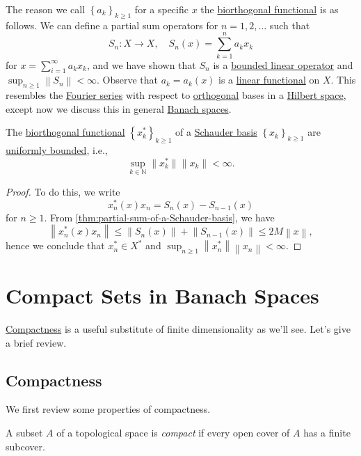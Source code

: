 The reason we call \(\left\{ a_k \right\} _{k\geq 1}\) for a specific \(x\) the \hyperref[def:biorthogonal-functional]{biorthogonal functional} is as follows. We can define a partial sum operators for \(n = 1, 2, \ldots  \) such that
\[
	S_n\colon X\to X,\quad S_n (x) = \sum\limits_{k=1}^{n} a_k x_k
\]
for \(x = \sum_{i=1}^{\infty }a_k x_k\), and we have shown that \(S_n\) is a \hyperref[def:bounded-linear-op]{bounded linear operator} and \(\sup _{n\geq 1} \left\lVert S_n\right\rVert < \infty \). Observe that \(a_k = a_k(x)\) is a \hyperref[def:linear-functional]{linear functional} on \(X\). This resembles the \hyperref[def:Fourier-series]{Fourier series} with respect to \hyperref[def:orthogonal-system]{orthogonal} bases in a \hyperref[def:Hilbert-space]{Hilbert space}, except now we discuss this in general \hyperref[def:Banach-space]{Banach spaces}.

\begin{proposition}
	The \hyperref[def:biorthogonal-functional]{biorthogonal functional} \(\left\{ x_k^{\ast} \right\} _{k\geq 1}\) of a \hyperref[def:Schauder-basis]{Schauder basis} \(\left\{ x_k \right\} _{k\geq 1}\) are \hyperref[def:uniformly-bounded]{uniformly bounded}, i.e.,
	\[
		\sup _{k\in \mathbb{N} }\lVert x_k ^{\ast}  \rVert \lVert x_{k}  \rVert < \infty .
	\]
\end{proposition}
\begin{proof}
	To do this, we write
	\[
		x_n^{\ast} (x) x_n = S_n(x) - S_{n-1}(x)
	\]
	for \(n \geq 1\). From \autoref{thm:partial-sum-of-a-Schauder-basis}, we have
	\[
		\left\lVert x^{\ast} _n(x)x_n\right\rVert \leq \left\lVert S_n(x)\right\rVert + \left\lVert S_{n-1}(x) \right\rVert \leq 2M \left\lVert x\right\rVert,
	\]
	hence we conclude that \(x_n^{\ast} \in X^{\ast} \) and \(\sup _{n\geq 1} \left\lVert x_n^{\ast} \right\rVert \left\lVert x_n\right\rVert < \infty \).
\end{proof}

\section{Compact Sets in Banach Spaces}
\hyperref[def:compact]{Compactness} is a useful substitute of finite dimensionality as we'll see. Let's give a brief review.
\subsection{Compactness}
We first review some properties of compactness.

\begin{definition}[Compact]\label{def:compact}
	A subset \(A\) of a topological space is \emph{compact} if every open cover of \(A\) has a finite subcover.
\end{definition}

